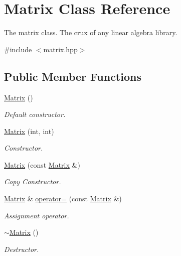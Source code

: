 \hypertarget{classMatrix}{}\section{Matrix Class Reference}
\label{classMatrix}


The matrix class. The crux of any linear algebra library.  




{\ttfamily \#include $<$matrix.\+hpp$>$}

\subsection*{Public Member Functions}
\begin{DoxyCompactItemize}
\item 
\hyperlink{classMatrix_a2dba13c45127354c9f75ef576f49269b}{Matrix} ()
\begin{DoxyCompactList}\small\item\em Default constructor. \end{DoxyCompactList}\item 
\hyperlink{classMatrix_adfbeb67cc3c43d96c53f881d79f919cb}{Matrix} (int, int)
\begin{DoxyCompactList}\small\item\em Constructor. \end{DoxyCompactList}\item 
\hyperlink{classMatrix_a0b9cfa2302a0273afb1b26e501f93abc}{Matrix} (const \hyperlink{classMatrix}{Matrix} \&)
\begin{DoxyCompactList}\small\item\em Copy Constructor. \end{DoxyCompactList}\item 
\hyperlink{classMatrix}{Matrix} \& \hyperlink{classMatrix_ae3695797299c70849667c22a098db137}{operator=} (const \hyperlink{classMatrix}{Matrix} \&)
\begin{DoxyCompactList}\small\item\em Assignment operator. \end{DoxyCompactList}\item 
\mbox{\label{classMatrix_a9b1c3627f573d78a2f08623fdfef990f}} 
\hyperlink{classMatrix_a9b1c3627f573d78a2f08623fdfef990f}{$\sim$\+Matrix} ()
\begin{DoxyCompactList}\small\item\em Destructor. \end{DoxyCompactList}\item 

\end{DoxyCompactItemize}
